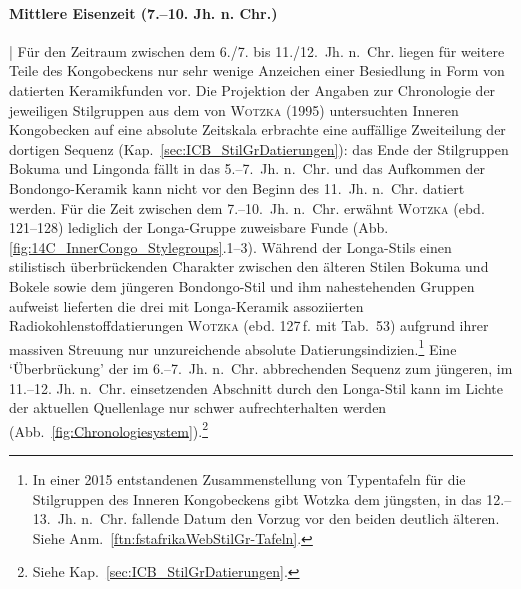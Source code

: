 \paragraph{Mittlere Eisenzeit (7.--10. Jh. n. Chr.)}\hspace{-.5em}|\hspace{.5em}\label{sec:MIA}%
Für den Zeitraum zwischen dem 6./7. bis 11./12.~Jh. n.~Chr. liegen für weitere Teile des Kongobeckens nur sehr wenige Anzeichen einer Besiedlung in Form von datierten Keramikfunden vor. Die Projektion der Angaben zur Chronologie der jeweiligen Stilgruppen aus dem von \textsc{Wotzka} (1995) untersuchten Inneren Kongobecken auf eine absolute Zeitskala erbrachte eine auffällige Zweiteilung der dortigen Sequenz (Kap.~\ref{sec:ICB_StilGrDatierungen}): das Ende der Stilgruppen Bokuma und Lingonda fällt in das 5.--7.~Jh. n.~Chr. und das Aufkommen der Bondongo-Keramik kann nicht vor den Beginn des 11.~Jh. n.~Chr. datiert werden. Für die Zeit zwischen dem 7.--10.~Jh. n.~Chr. erwähnt \textsc{Wotzka} (ebd. 121--128) lediglich der Longa-Gruppe zuweisbare Funde (Abb. \ref{fig:14C_InnerCongo_Stylegroups}.1--3). Während der Longa-Stils einen stilistisch überbrückenden Charakter zwischen den älteren Stilen Bokuma und Bokele sowie dem jüngeren Bondongo-Stil und ihm nahestehenden Gruppen aufweist lieferten die drei mit Longa-Keramik assoziierten Radiokohlenstoffdatierungen \textsc{Wotzka} (ebd. 127\,f. mit Tab.~53) aufgrund ihrer massiven Streuung nur unzureichende absolute Datierungsindizien.\footnote{In einer 2015 entstandenen Zusammenstellung von Typentafeln für die Stilgruppen des Inneren Kongobeckens gibt Wotzka dem jüngsten, in das 12.--13.~Jh. n.~Chr. fallende Datum den Vorzug vor den beiden deutlich älteren. Siehe Anm.~\ref{ftn:fstafrikaWebStilGr-Tafeln}.} Eine \enquote*{Überbrückung} der im 6.--7.~Jh. n.~Chr. abbrechenden Sequenz zum jüngeren, im 11.--12. Jh. n.~Chr. einsetzenden Abschnitt durch den Longa-Stil kann im Lichte der aktuellen Quellenlage nur schwer aufrechterhalten werden (Abb.~\ref{fig:Chronologiesystem}).\footnote{Siehe Kap.~\ref{sec:ICB_StilGrDatierungen}.} 

